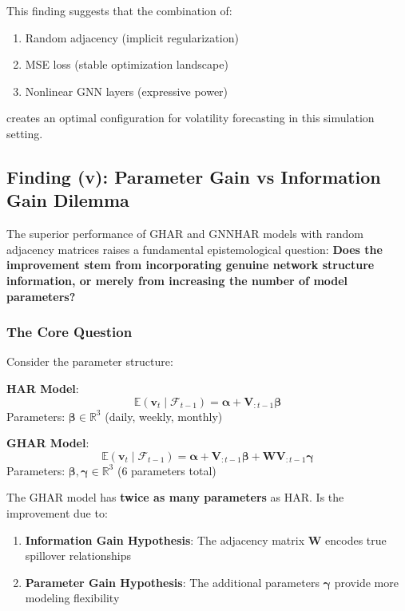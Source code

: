 \documentclass[10pt,a4paper]{article}
\begin{document}
This finding suggests that the combination of:
\begin{enumerate}
\item Random adjacency (implicit regularization)
\item MSE loss (stable optimization landscape)
\item Nonlinear GNN layers (expressive power)
\end{enumerate}

creates an optimal configuration for volatility forecasting in this simulation setting.

\subsection{Finding (v): Parameter Gain vs Information Gain Dilemma}

The superior performance of GHAR and GNNHAR models with random adjacency matrices raises a fundamental epistemological question: \textbf{Does the improvement stem from incorporating genuine network structure information, or merely from increasing the number of model parameters?}

\subsubsection{The Core Question}

Consider the parameter structure:

\textbf{HAR Model}:
\begin{equation}
\mathbb{E}(\mathbf{v}_t \mid \mathcal{F}_{t-1}) = \boldsymbol{\alpha} + \mathbf{V}_{:t-1} \boldsymbol{\beta}
\end{equation}
Parameters: $\boldsymbol{\beta} \in \mathbb{R}^3$ (daily, weekly, monthly)

\textbf{GHAR Model}:
\begin{equation}
\mathbb{E}(\mathbf{v}_t \mid \mathcal{F}_{t-1}) = \boldsymbol{\alpha} + \mathbf{V}_{:t-1} \boldsymbol{\beta} + \mathbf{W} \mathbf{V}_{:t-1} \boldsymbol{\gamma}
\end{equation}
Parameters: $\boldsymbol{\beta}, \boldsymbol{\gamma} \in \mathbb{R}^3$ (6 parameters total)

The GHAR model has \textbf{twice as many parameters} as HAR. Is the improvement due to:
\begin{enumerate}
\item \textbf{Information Gain Hypothesis}: The adjacency matrix $\mathbf{W}$ encodes true spillover relationships
\item \textbf{Parameter Gain Hypothesis}: The additional parameters $\boldsymbol{\gamma}$ provide more modeling flexibility
\end{enumerate}
\end{document}
